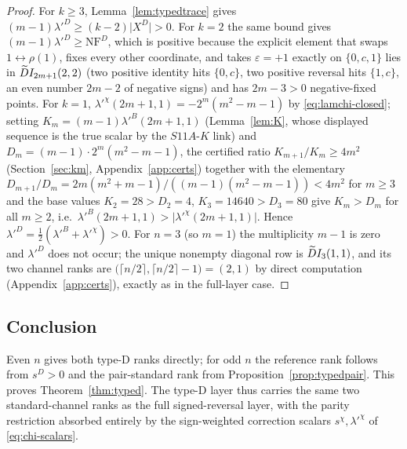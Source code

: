 \begin{proof}
For $k\ge3$, Lemma~\ref{lem:typedtrace} gives $(m-1)\lambda'^{D}\ge(k-2)\lvert X^{D}\rvert>0$.  For $k=2$ the same
bound gives $(m-1)\lambda'^{D}\ge\mathrm{NF}^{D}$, which is positive because the explicit element that swaps
$1\leftrightarrow\rho(1)$, fixes every other coordinate, and takes $\varepsilon=+1$ exactly on $\{0,c,1\}$ lies in
$\widetilde{D}I_{2m+1}(2,2)$ (two positive identity hits $\{0,c\}$, two positive reversal hits $\{1,c\}$, an even number
$2m-2$ of negative signs) and has $2m-3>0$ negative-fixed points.  For $k=1$, $\lambda'^{\chi}(2m+1,1)=-2^{m}(m^2-m-1)$
by \eqref{eq:lamchi-closed}; setting $K_m=(m-1)\lambda'^{B}(2m+1,1)$ (Lemma~\ref{lem:K}, whose displayed sequence is
the true scalar by the $S11A$-$K$ link) and $D_m=(m-1)\cdot2^{m}(m^2-m-1)$, the certified ratio
$K_{m+1}/K_m\ge4m^2$ (Section~\ref{sec:km}, Appendix~\ref{app:certs}) together with the elementary
$D_{m+1}/D_m=2m(m^2+m-1)/((m-1)(m^2-m-1))<4m^2$ for $m\ge3$ and the base values $K_2=28>D_2=4$, $K_3=14640>D_3=80$
give $K_m>D_m$ for all $m\ge2$, i.e.\ $\lambda'^{B}(2m+1,1)>\lvert\lambda'^{\chi}(2m+1,1)\rvert$.  Hence
$\lambda'^{D}=\tfrac12(\lambda'^{B}+\lambda'^{\chi})>0$.  For $n=3$ (so $m=1$) the multiplicity $m-1$ is zero and
$\lambda'^{D}$ does not occur; the unique nonempty diagonal row is $\widetilde{D}I_3(1,1)$, and its two channel ranks are
$\bigl(\lceil n/2\rceil,\lceil n/2\rceil-1\bigr)=(2,1)$ by direct computation (Appendix~\ref{app:certs}), exactly as in
the full-layer case.
\end{proof}

\subsection{Conclusion}

Even $n$ gives both type-D ranks directly; for odd $n$ the reference rank follows from $s^{D}>0$ and the
pair-standard rank from Proposition~\ref{prop:typedpair}.  This proves Theorem~\ref{thm:typed}.  The type-D layer thus
carries the same two standard-channel ranks as the full signed-reversal layer, with the parity restriction absorbed
entirely by the sign-weighted correction scalars $s^{\chi},\lambda'^{\chi}$ of \eqref{eq:chi-scalars}.
